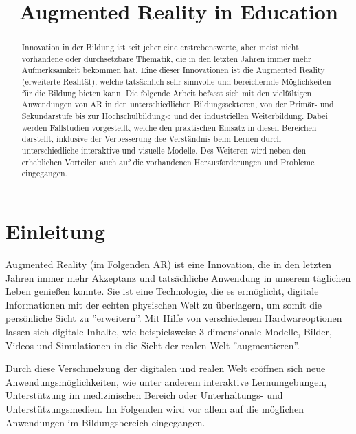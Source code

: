 \documentclass[conference]{IEEEtran}
\begin{document}
\title{Augmented Reality in Education}

\author{
}

\maketitle

\begin{abstract}
    Innovation in der Bildung ist seit jeher eine erstrebenswerte, aber meist nicht
    vorhandene oder durchsetzbare Thematik, die in den letzten Jahren immer mehr
    Aufmerksamkeit bekommen hat. Eine dieser Innovationen ist die Augmented Reality
    (erweiterte Realität), welche tatsächlich sehr sinnvolle und bereichernde
    Möglichkeiten für die Bildung bieten kann.
    Die folgende Arbeit befasst sich mit den vielfältigen Anwendungen von AR in 
    den unterschiedlichen Bildungssektoren, von der Primär- und Sekundarstufe bis zur
    Hochschulbildung< und der industriellen Weiterbildung. Dabei werden Fallstudien vorgestellt,
    welche den praktischen Einsatz in diesen Bereichen darstellt, inklusive der Verbesserung 
    dee Verständnis beim Lernen durch unterschiedliche interaktive und visuelle Modelle.
    Des Weiteren wird neben den erheblichen Vorteilen auch auf die vorhandenen Herausforderungen
    und Probleme eingegangen.
\end{abstract}

\section{Einleitung}
Augmented Reality (im Folgenden AR) ist eine Innovation, die in den letzten Jahren immer mehr Akzeptanz und tatsächliche Anwendung in unserem täglichen Leben genießen konnte. 
Sie ist eine Technologie, die es ermöglicht, digitale Informationen mit der echten physischen Welt zu überlagern, um somit die persönliche Sicht zu ''erweitern''. 
Mit Hilfe von verschiedenen Hardwareoptionen lassen sich digitale Inhalte, wie beispielsweise 3 dimensionale Modelle, Bilder, Videos und Simulationen in die Sicht der realen
Welt ''augmentieren''.

Durch diese Verschmelzung der digitalen und realen Welt eröffnen sich neue Anwendungsmöglichkeiten,
wie unter anderem interaktive Lernumgebungen, Unterstützung im medizinischen Bereich
oder Unterhaltungs- und Unterstützungsmedien. Im Folgenden wird vor allem auf die möglichen Anwendungen im Bildungsbereich eingegangen. 
\end{document}
